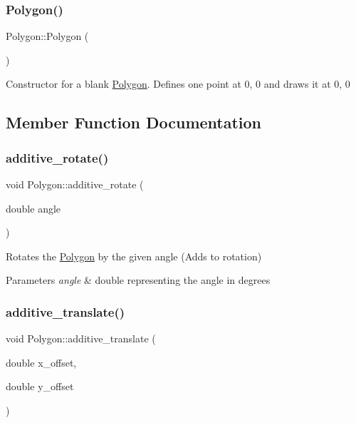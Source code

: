 \subsubsection{\texorpdfstring{Polygon()}{Polygon()}\hspace{0.1cm}{\footnotesize\ttfamily [3/3]}}
{\footnotesize\ttfamily Polygon\+::\+Polygon (\begin{DoxyParamCaption}{ }\end{DoxyParamCaption})}

Constructor for a blank \mbox{\hyperlink{class_polygon}{Polygon}}. Defines one point at 0, 0 and draws it at 0, 0 

\subsection{Member Function Documentation}
\mbox{\label{class_polygon_aa058b0c05dcb8a9c4c0f2737ac59fb64}} 
\subsubsection{\texorpdfstring{additive\+\_\+rotate()}{additive\_rotate()}}
{\footnotesize\ttfamily void Polygon\+::additive\+\_\+rotate (\begin{DoxyParamCaption}\item[{double}]{angle }\end{DoxyParamCaption})}

Rotates the \mbox{\hyperlink{class_polygon}{Polygon}} by the given angle (Adds to rotation) 
\begin{DoxyParams}{Parameters}
{\em angle} & double representing the angle in degrees \\
\hline
\end{DoxyParams}
\mbox{\label{class_polygon_aa066ce6c55fe73f2187919085016e9ec}} 
\subsubsection{\texorpdfstring{additive\+\_\+translate()}{additive\_translate()}}
{\footnotesize\ttfamily void Polygon\+::additive\+\_\+translate (\begin{DoxyParamCaption}\item[{double}]{x\+\_\+offset,  }\item[{double}]{y\+\_\+offset }\end{DoxyParamCaption})}

